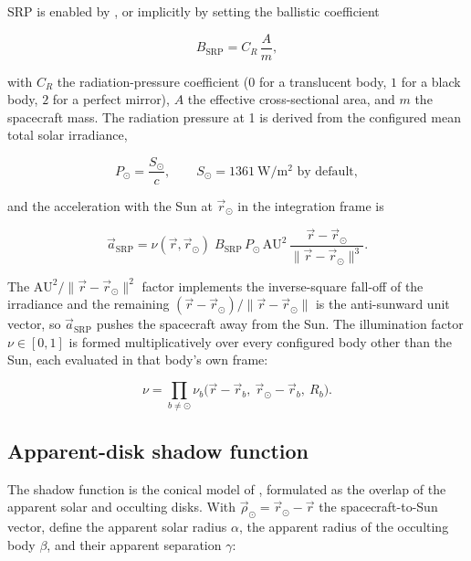 SRP is enabled by , or implicitly by setting the ballistic
coefficient

\begin{equation}
  \label{eq:dyn-srp-bcoeff}
  B_\mathrm{SRP} = C_R\,\frac{A}{m},
\end{equation}

with $C_R$ the radiation-pressure coefficient ($0$ for a translucent body, $1$
for a black body, $2$ for a perfect mirror), $A$ the effective cross-sectional
area, and $m$ the spacecraft mass. The radiation pressure at \SI{1}{\au} is
derived from the configured mean total solar irradiance,

\begin{equation}
  \label{eq:dyn-srp-pressure}
  P_\odot = \frac{S_\odot}{c},
  \qquad S_\odot = \SI{1361}{\watt\per\meter\squared} \text{ by default},
\end{equation}

and the acceleration with the Sun at $\vec{r}_\odot$ in the integration frame is

\begin{equation}
  \label{eq:dyn-srp}
  \vec{a}_\mathrm{SRP} =
  \nu(\vec{r},\vec{r}_\odot)\;
  B_\mathrm{SRP}\,P_\odot\,\mathrm{AU}^{2}\,
  \frac{\vec{r}-\vec{r}_\odot}{\lVert\vec{r}-\vec{r}_\odot\rVert^{3}} .
\end{equation}

The $\mathrm{AU}^2/\lVert\vec{r}-\vec{r}_\odot\rVert^{2}$ factor implements the
inverse-square fall-off of the irradiance and the remaining
$(\vec{r}-\vec{r}_\odot)/\lVert\vec{r}-\vec{r}_\odot\rVert$ is the anti-sunward
unit vector, so $\vec{a}_\mathrm{SRP}$ pushes the spacecraft away from the Sun.
The illumination factor $\nu\in[0,1]$ is formed multiplicatively over every
configured body other than the Sun, each evaluated in that body's own frame:

\begin{equation}
  \label{eq:dyn-srp-illum}
  \nu = \prod_{b\ne\odot} \nu_b\bigl(\vec{r}-\vec{r}_b,\ \vec{r}_\odot-\vec{r}_b,\ R_b\bigr).
\end{equation}

\subsection{Apparent-disk shadow function}

The shadow function is the conical model of \citet[Sec.~3.4.2]{montenbruck2000},
formulated as the overlap of the apparent solar and occulting disks. With
$\vec{\rho}_\odot = \vec{r}_\odot-\vec{r}$ the spacecraft-to-Sun vector, define
the apparent solar radius $\alpha$, the apparent radius of the occulting body
$\beta$, and their apparent separation $\gamma$:

